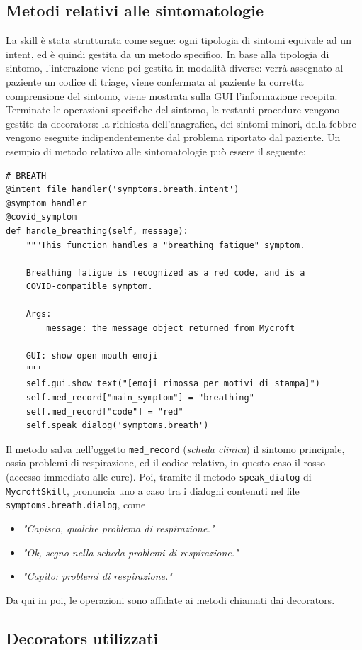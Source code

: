 \subsection{Metodi relativi alle sintomatologie}
La skill è stata strutturata come segue: ogni tipologia di sintomi equivale ad un intent, ed è quindi gestita da un metodo specifico. In base alla tipologia di sintomo, l'interazione viene poi gestita in modalità diverse: verrà assegnato al paziente un codice di triage, viene confermata al paziente la corretta comprensione del sintomo, viene mostrata sulla GUI l'informazione recepita. Terminate le operazioni specifiche del sintomo, le restanti procedure vengono gestite da decorators: la richiesta dell'anagrafica, dei sintomi minori, della febbre vengono eseguite indipendentemente dal problema riportato dal paziente. Un esempio di metodo relativo alle sintomatologie può essere il seguente:
\begin{verbatim}
# BREATH
@intent_file_handler('symptoms.breath.intent')
@symptom_handler
@covid_symptom
def handle_breathing(self, message):
    """This function handles a "breathing fatigue" symptom.

    Breathing fatigue is recognized as a red code, and is a
    COVID-compatible symptom.

    Args:
        message: the message object returned from Mycroft

    GUI: show open mouth emoji
    """
    self.gui.show_text("[emoji rimossa per motivi di stampa]")
    self.med_record["main_symptom"] = "breathing"
    self.med_record["code"] = "red"
    self.speak_dialog('symptoms.breath')
\end{verbatim}
Il metodo salva nell'oggetto \texttt{med\_record} (\textit{scheda clinica}) il sintomo principale, ossia problemi di respirazione, ed il codice relativo, in questo caso il rosso (accesso immediato alle cure). Poi, tramite il metodo \texttt{speak\_dialog} di \texttt{MycroftSkill}, pronuncia uno a caso tra i dialoghi contenuti nel file \texttt{symptoms.breath.dialog}, come
\begin{itemize}
    \item \textit{"Capisco, qualche problema di respirazione."}
    \item \textit{"Ok, segno nella scheda problemi di respirazione."}
    \item \textit{"Capito: problemi di respirazione."}
\end{itemize}
Da qui in poi, le operazioni sono affidate ai metodi chiamati dai decorators.
\subsection{Decorators utilizzati}
